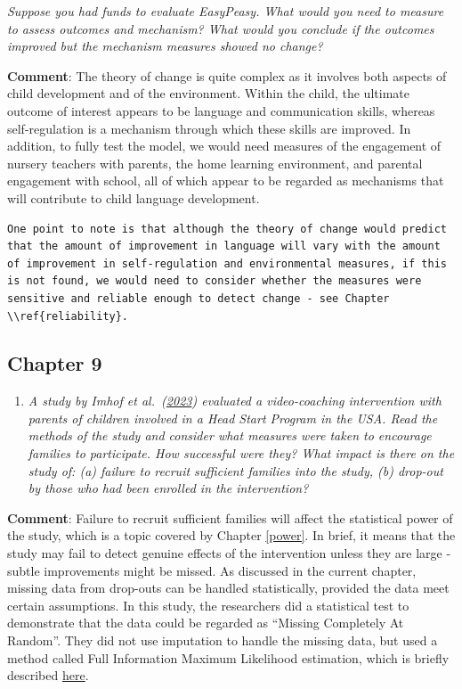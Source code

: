 \documentclass{krantz}
\providecommand{\tightlist}{%
\setlength{\itemsep}{0pt}\setlength{\parskip}{0pt}}
\begin{document}
\emph{Suppose you had funds to evaluate EasyPeasy. What would you need to measure to assess outcomes and mechanism? What would you conclude if the outcomes improved but the mechanism measures showed no change?}

\textbf{Comment}: The theory of change is quite complex as it involves both aspects of child development and of the environment. Within the child, the ultimate outcome of interest appears to be language and communication skills, whereas self-regulation is a mechanism through which these skills are improved. In addition, to fully test the model, we would need measures of the engagement of nursery teachers with parents, the home learning environment, and parental engagement with school, all of which appear to be regarded as mechanisms that will contribute to child language development.

\begin{verbatim}
One point to note is that although the theory of change would predict that the amount of improvement in language will vary with the amount of improvement in self-regulation and environmental measures, if this is not found, we would need to consider whether the measures were sensitive and reliable enough to detect change - see Chapter \\ref{reliability}.
\end{verbatim}

\hypertarget{chapter-9}{%
\subsection{Chapter 9}\label{chapter-9}}

\begin{enumerate}
\def\labelenumi{\arabic{enumi}.}
\tightlist
\item
  \emph{A study by Imhof et al.~(\href{file:///Users/dorothybishop/Rprojects/EvaluatingWhatWorks2023/_book/dropouts.html\#ref-imhof2023}{2023}) evaluated a video-coaching intervention with parents of children involved in a Head Start Program in the USA. Read the methods of the study and consider what measures were taken to encourage families to participate. How successful were they? What impact is there on the study of: (a) failure to recruit sufficient families into the study, (b) drop-out by those who had been enrolled in the intervention?}
\end{enumerate}

\textbf{Comment}: Failure to recruit sufficient families will affect the statistical power of the study, which is a topic covered by Chapter \ref{power}. In brief, it means that the study may fail to detect genuine effects of the intervention unless they are large - subtle improvements might be missed. As discussed in the current chapter, missing data from drop-outs can be handled statistically, provided the data meet certain assumptions. In this study, the researchers did a statistical test to demonstrate that the data could be regarded as ``Missing Completely At Random''. They did not use imputation to handle the missing data, but used a method called Full Information Maximum Likelihood estimation, which is briefly described \href{https://www.missingdata.nl/missing-data/missing-data-methods/full-information-maximum-likelihood/}{here}.
\end{document}
